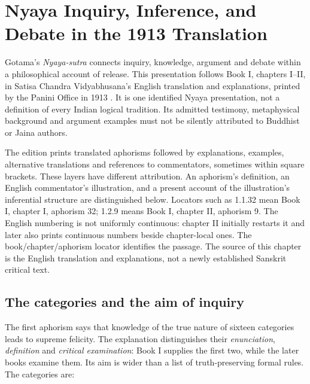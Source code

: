 \chapter{Nyaya Inquiry, Inference, and Debate in the 1913 Translation}
\label{sec:p13-nyaya-sutra-inference-and-debate}

Gotama's \emph{Nyaya-sutra} connects inquiry, knowledge, argument and debate
within a philosophical account of release. This presentation follows Book I,
chapters I--II, in Satisa Chandra Vidyabhusana's English translation and
explanations, printed by the Panini Office in 1913
\cite[Book I, chapters I--II, pp.~1--21]{GotamaVidyabhusana1913NyayaSutras}.
It is one identified Nyaya presentation, not a definition of every Indian
logical tradition. Its admitted testimony, metaphysical background and
argument examples must not be silently attributed to Buddhist or Jaina authors.

The edition prints translated aphorisms followed by explanations, examples,
alternative translations and references to commentators, sometimes within
square brackets. These layers have different attribution. An aphorism's
definition, an English commentator's illustration, and a present account of
the illustration's inferential structure are distinguished below. Locators
such as 1.1.32 mean Book I, chapter I, aphorism 32; 1.2.9 means Book I,
chapter II, aphorism 9. The English numbering is not uniformly continuous:
chapter II initially restarts it and later also prints continuous numbers
beside chapter-local ones. The book/chapter/aphorism locator identifies the
passage. The source of this chapter is the English translation and explanations,
not a newly established Sanskrit critical text.

\section{The categories and the aim of inquiry}
\label{sec:p13-nyaya-categories}

The first aphorism says that knowledge of the true nature of sixteen
categories leads to supreme felicity. The explanation distinguishes their
\emph{enunciation}, \emph{definition} and \emph{critical examination}:
Book I supplies the first two, while the later books examine them. Its aim
is wider than a list of truth-preserving formal rules. The categories are:

